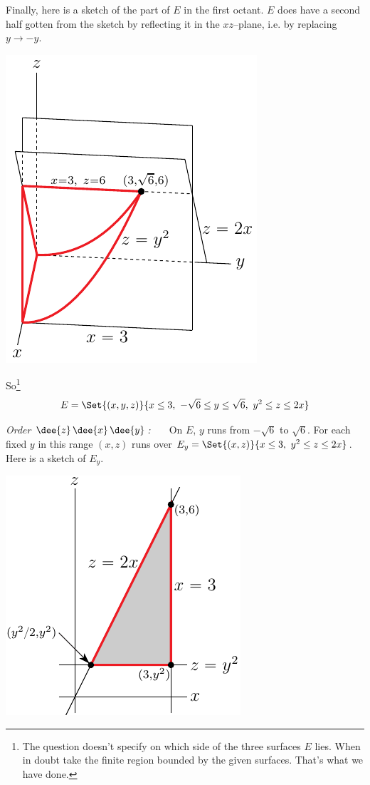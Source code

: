 \begin{solution}
Finally, here is a sketch of the part of $E$ in the first octant.
$E$ does have a second half gotten from the sketch by reflecting it
in the $xz$--plane, i.e. by replacing $y\rightarrow-y$.

\begin{center}
\includegraphics{fig/OE14D_9.pdf}
\end{center} 

So\footnote{The question doesn't specify on which side of the three surfaces
$E$ lies. When in doubt take the finite region bounded by the given surfaces.
That's what we have done.}
\begin{equation*}
E = \Set{(x,y,z)}{x\le 3,\ -\sqrt{6}\le y\le \sqrt{6},\ y^2\le z\le 2x}
\end{equation*}

\emph{Order $\dee{z}\,\dee{x}\,\dee{y}$:\ \ \ }
On $E$, $y$ runs from $-\sqrt{6}$ to $\sqrt{6}$. For each fixed $y$
in this range $(x,z)$ runs over $E_y=\Set{(x,z)}{x\le 3,\ y^2\le z\le 2x}$.
Here is a sketch of $E_y$.

\begin{center}
\includegraphics{fig/OE14D_9e.pdf}
\end{center} 


\end{solution}
